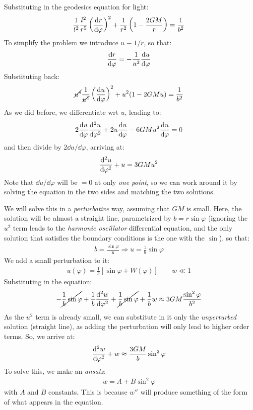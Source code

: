 \documentclass[../template.tex]{subfiles}
\begin{document}
Substituting in the geodesics equation for light:
\begin{align*}
    \frac{1}{l^2} \frac{l^2}{r^5} \left(\dv{r}{\varphi}\right)^2 + \frac{1}{r^2} \left(1-\frac{2GM}{r} \right) = \frac{1}{b^2}    
\end{align*}
To simplify the problem we introduce $u \equiv 1/r$, so that:
\begin{align*}
    \dv{r}{\varphi} = -\frac{1}{u^2} \dv{u}{\varphi} 
\end{align*}  
Substituting back:
\begin{align*}
    \cancel{u^4} \frac{1}{\cancel{u^4}}\left( \dv{u}{\varphi}\right)^2 + u^2 (1-2GMu) = \frac{1}{b^2}  
\end{align*}
As we did before, we differentiate wrt $u$, leading to:
\begin{align*}
    2 \dv{u}{\varphi} \dv [2]{u}{\varphi} + 2u \dv{u}{\varphi} - 6GMu^2 \dv{u}{\varphi} = 0
\end{align*}
and then divide by $2\dd{u}/\dd{\varphi}$, arriving at:
\begin{align*}
    \dv[2]{u}{\varphi} + u = 3GMu^2
\end{align*}
Note that $\dd{u}/\dd{\varphi}$ will be $=0$ at only \textit{one point}, so we can work around it by solving the equation in the two sides and matching the two solutions.

We will solve this in a \textit{perturbative} way, assuming that $GM$ is small. Here, the solution will be almost a straight line, parametrized by $b = r\sin\varphi$ (ignoring the $u^2$ term leads to the \textit{harmonic oscillator} differential equation, and the only solution that satisfies the boundary conditions is the one with the $\sin$), so that:
\begin{align*}
    b = \frac{\sin\varphi}{u} \Rightarrow u=\frac{1}{b} \sin\varphi  
\end{align*}   
We add a small perturbation to it:
\begin{align*}
    u(\varphi) = \frac{1}{b}\left[\sin\varphi + W(\varphi)\right] \qquad w \ll 1 
\end{align*}
Substituting in the equation:
\begin{align*}
    -\cancel{\frac{1}{b} \sin\varphi} + \frac{1}{b} \dv[2]{w}{\varphi} + \cancel{\frac{1}{b} \sin\varphi} + \frac{1}{b} w \approx 3GM \frac{\sin^2 \varphi}{b^2}     
\end{align*}
As the $u^2$ term is already small, we can substitute in it only the \textit{unperturbed} solution (straight line), as adding the perturbation will only lead to higher order terms. So, we arrive at:
\begin{align*}
    \dv[2]{w}{\varphi} + w \approx \frac{3GM}{b} \sin^2 \varphi 
\end{align*}
To solve this, we make an \textit{ansatz}:
\begin{align*}
    w = A + B \sin^2 \varphi
\end{align*} 
with $A$ and $B$ constants. This is because $w''$ will produce something of the form of what appears in the equation.
\end{document}
